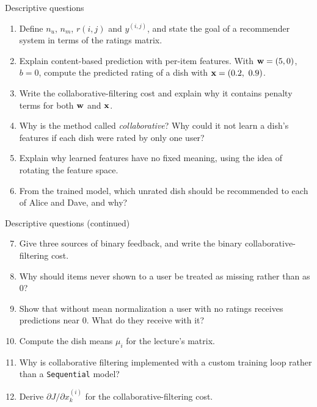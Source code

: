 \documentclass[aspectratio=169,10pt]{beamer}
\begin{document}
\begin{frame}{Descriptive questions}
  \footnotesize
  \begin{enumerate}
    \item Define $n_u$, $n_m$, $r(i,j)$ and $y^{(i,j)}$, and state the goal of a recommender
          system in terms of the ratings matrix. \hfill{}
    \item Explain content-based prediction with per-item features. With
          $\mathbf{w} = (5, 0)$, $b = 0$, compute the predicted rating of a dish with
          $\mathbf{x} = (0.2,\ 0.9)$. \hfill{}
    \item Write the collaborative-filtering cost and explain why it contains penalty terms
          for both $\mathbf{w}$ and $\mathbf{x}$. \hfill{}
    \item Why is the method called \emph{collaborative}? Why could it not learn a dish's
          features if each dish were rated by only one user? \hfill{}
    \item Explain why learned features have no fixed meaning, using the idea of rotating
          the feature space. \hfill{}
    \item From the trained model, which unrated dish should be recommended to each of
          Alice and Dave, and why? \hfill{}
  \end{enumerate}
\end{frame}

\begin{frame}{Descriptive questions (continued)}
  \footnotesize
  \begin{enumerate}\setcounter{enumi}{6}
    \item Give three sources of binary feedback, and write the binary collaborative-filtering
          cost. \hfill{}
    \item Why should items never shown to a user be treated as missing rather than as
          $0$? \hfill{}
    \item Show that without mean normalization a user with no ratings receives predictions
          near $0$. What do they receive with it? \hfill{}
    \item Compute the dish means $\mu_i$ for the lecture's matrix. \hfill{}
    \item Why is collaborative filtering implemented with a custom training loop rather
          than a \texttt{Sequential} model? \hfill{}
    \item Derive $\partial J/\partial x^{(i)}_k$ for the collaborative-filtering cost.
          \hfill{}
  \end{enumerate}
\end{frame}
\end{document}
